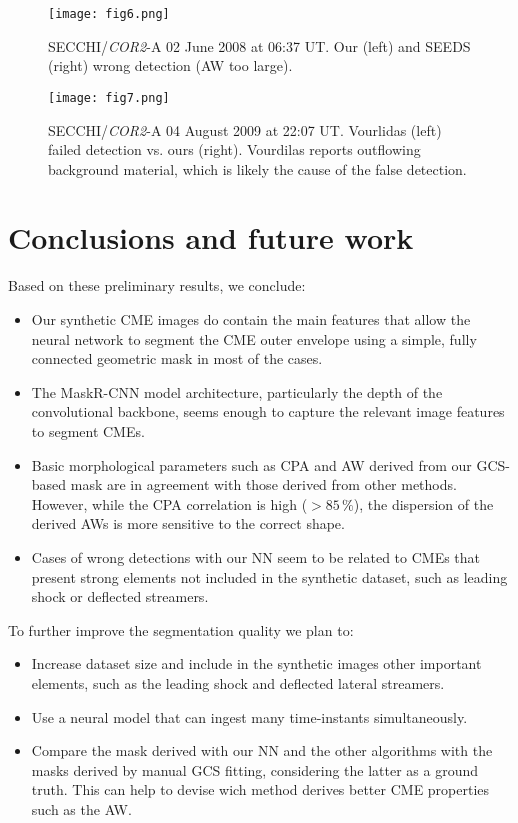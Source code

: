 \documentclass[baaa]{baaa}
\begin{document}
\begin{figure}[!h]
  \centering
  \texttt{[image: fig6.png]}
  \caption{ SECCHI/\textit{COR2}-A  02 June 2008 at 06:37 UT. Our (left) and SEEDS (right) wrong detection (AW too large). }
  \label{fig:figure6}
\end{figure}

\begin{figure}[!h]
  \centering
  \texttt{[image: fig7.png]}
  \caption{ SECCHI/\textit{COR2}-A 04 August 2009 at 22:07 UT. Vourlidas (left) failed detection vs. ours (right). Vourdilas reports outflowing background material, which is likely the cause of the false detection.  }
  \label{fig:figure7}
\end{figure}

\section{Conclusions and future work}
Based on these preliminary results, we conclude:
\begin{itemize}
\item Our synthetic CME images do contain the main features that allow the neural network to segment the CME outer envelope using a simple, fully connected geometric mask in most of the cases. 
\item The MaskR-CNN model architecture, particularly the depth of the convolutional backbone, seems enough to capture the relevant image features to segment CMEs.
\item Basic morphological parameters such as CPA and AW derived from our GCS-based mask are in agreement with those derived from other methods. However, while the CPA correlation is high ($>85\,\%$), the dispersion of the derived AWs is more sensitive to the correct shape. 
\item Cases of wrong detections with our NN seem to be related to CMEs that present strong elements not included in the synthetic dataset, such as leading shock or deflected streamers. 
\end{itemize}
To further improve the segmentation quality we plan to:
\begin{itemize}
\item Increase dataset size and include in the synthetic images other important elements, such as the leading shock and deflected lateral streamers. 
\item Use a neural model that can ingest many time-instants simultaneously.
\item Compare the mask derived with our NN and the other algorithms with the masks derived by manual GCS fitting, considering the latter as a ground truth. This can help to devise wich method derives better CME properties such as the AW.
\end{itemize}
\end{document}
